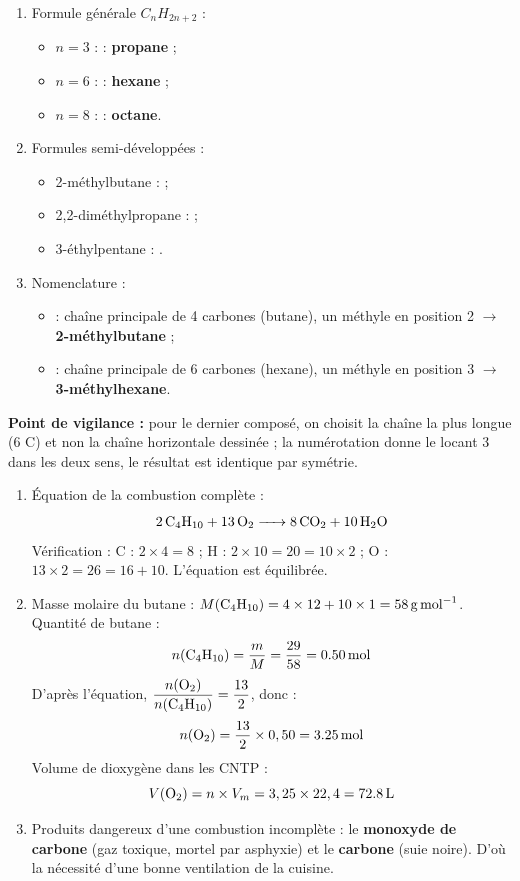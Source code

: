 \documentclass[11pt]{article}
\begin{document}
\begin{corrige}
\begin{enumerate}
\item Formule générale $C_nH_{2n+2}$ :
\begin{itemize}
\item $n = 3$ :  : \textbf{propane} ;
\item $n = 6$ :  : \textbf{hexane} ;
\item $n = 8$ :  : \textbf{octane}.
\end{itemize}
\item Formules semi-développées :
\begin{itemize}
\item 2-méthylbutane :  ;
\item 2,2-diméthylpropane :  ;
\item 3-éthylpentane : .
\end{itemize}
\item Nomenclature :
\begin{itemize}
\item {} : chaîne principale de 4 carbones (butane), un méthyle en position 2 $\rightarrow$ \textbf{2-méthylbutane} ;
\item {} : chaîne principale de 6 carbones (hexane), un méthyle en position 3 $\rightarrow$ \textbf{3-méthylhexane}.
\end{itemize}
\end{enumerate}
\textbf{Point de vigilance :} pour le dernier composé, on choisit la chaîne la plus longue (6 C) et non la chaîne horizontale dessinée ; la numérotation donne le locant 3 dans les deux sens, le résultat est identique par symétrie.
\end{corrige}

\begin{corrige}
\begin{enumerate}
\item Équation de la combustion complète :
\[ \ce{2 C4H10 + 13 O2 -> 8 CO2 + 10 H2O} \]
Vérification : C : $2\times4 = 8$ ; H : $2\times10 = 20 = 10\times2$ ; O : $13\times2 = 26 = 16 + 10$. L'équation est équilibrée.
\item Masse molaire du butane : $M(\ce{C4H10}) = 4\times12 + 10\times1 = \SI{58}{g.mol^{-1}}$.
Quantité de butane :
\[ n(\ce{C4H10}) = \frac{m}{M} = \frac{29}{58} = \SI{0,50}{mol} \]
D'après l'équation, $\dfrac{n(\ce{O2})}{n(\ce{C4H10})} = \dfrac{13}{2}$, donc :
\[ n(\ce{O2}) = \frac{13}{2}\times 0,50 = \SI{3,25}{mol} \]
Volume de dioxygène dans les CNTP :
\[ V(\ce{O2}) = n \times V_m = 3,25 \times 22,4 = \SI{72,8}{L} \]
\item Produits dangereux d'une combustion incomplète : le \textbf{monoxyde de carbone } (gaz toxique, mortel par asphyxie) et le \textbf{carbone } (suie noire). D'où la nécessité d'une bonne ventilation de la cuisine.
\end{enumerate}
\end{corrige}
\end{document}
